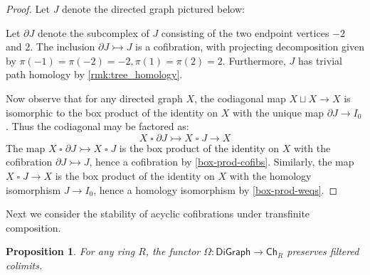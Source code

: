 \documentclass[11pt]{article}
\newtheorem{proposition}[theo]{Proposition}
\theoremstyle{definition}
\numberwithin{equation}{section}
\newcommand{\Ch}{\mathsf{Ch}}
\newcommand{\DiGraph}{\mathsf{DiGraph}}
\newcommand{\gtimes}{\mathbin{\square}}
\newcommand{\cto}{\rightarrowtail}
\newcommand{\from}{\colon}
\begin{document}
\begin{proof}
Let $J$ denote the directed graph pictured below:

\begin{figure}[H]
    \centering
\end{figure}

Let $\partial J$ denote the subcomplex of $J$ consisting of the two endpoint vertices $-2$ and $2$. The inclusion $\partial J \cto J$ is a cofibration, with projecting decomposition given by $\pi(-1) = \pi(-2) = -2, \pi(1) = \pi(2) = 2$.  Furthermore, $J$ has trivial path homology by \cref{rmk:tree_homology}.

Now observe that for any directed graph $X$, the codiagonal map $X \sqcup X \to X$ is isomorphic to the box product of the identity on $X$ with the unique map $\partial J \to I_0$. Thus the codiagonal may be factored as:
\[
X \gtimes{\partial J} \cto X \gtimes{J} \to X
\]
The map $X \gtimes{\partial J} \cto X \gtimes{J}$ is the box product of the identity on $X$ with the cofibration $\partial J \cto J$, hence a cofibration by \cref{box-prod-cofibs}. Similarly, the map $X \gtimes{J} \to X$ is the box product of the identity on $X$ with the homology isomorphism $J \to I_0$, hence a homology isomorphism by \cref{box-prod-weqs}.
\end{proof}

Next we consider the stability of acyclic cofibrations under transfinite composition.

\begin{proposition}\label{Omega-filtered-colim}
For any ring $R$, the functor $\Omega \from \DiGraph \to \Ch_R$ preserves filtered colimits.
\end{proposition}
\end{document}
